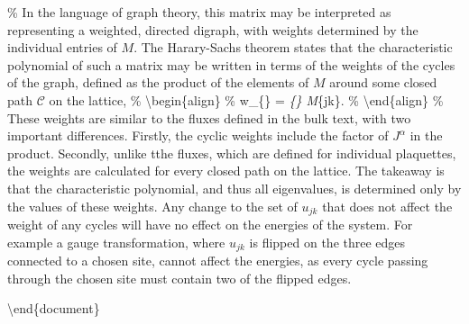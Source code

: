 \% In the language of graph theory, this matrix may be interpreted as
representing a weighted, directed digraph, with weights determined by
the individual entries of \(M\). The Harary-Sachs theorem
\cite{StreifelSkewCharacteristic2016,HararyDeterminant1962} states that
the characteristic polynomial of such a matrix may be written in terms
of the weights of the cycles of the graph, defined as the product of the
elements of \(M\) around some closed path \(\mathcal C\) on the lattice,
\% \textbackslash begin\{align\} \% w\_\{\} =
\prod\emph{\{\} M}\{jk\}. \% \textbackslash end\{align\} \%
These weights are similar to the fluxes defined in the bulk text, with
two important differences. Firstly, the cyclic weights include the
factor of \(J^\alpha\) in the product. Secondly, unlike tthe fluxes,
which are defined for individual plaquettes, the weights are calculated
for every closed path on the lattice. The takeaway is that the
characteristic polynomial, and thus all eigenvalues, is determined only
by the values of these weights. Any change to the set of \(u_{jk}\) that
does not affect the weight of any cycles will have no effect on the
energies of the system. For example a gauge transformation, where
\(u_{jk}\) is flipped on the three edges connected to a chosen site,
cannot affect the energies, as every cycle passing through the chosen
site must contain two of the flipped edges.

\par

\textbackslash end\{document\}
